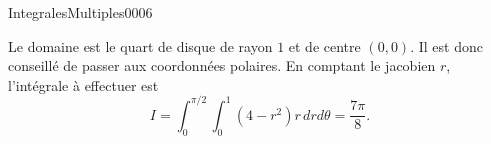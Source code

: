 \begin{corrige}{IntegralesMultiples0006}

	Le domaine est le quart de disque de rayon $1$ et de centre $(0,0)$. Il est donc conseillé de passer aux coordonnées polaires. En comptant le jacobien $r$, l'intégrale à effectuer est
	\begin{equation}
		I=\int_0^{\pi/2}\int_0^{1}(4-r^2)r\,drd\theta=\frac{ 7\pi }{ 8 }.
	\end{equation}

\end{corrige}
